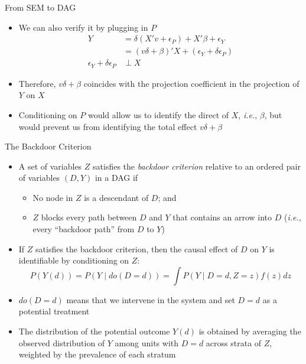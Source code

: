 \documentclass[aspectratio=1610,12pt,xcolor=dvipsnames]{beamer}
\begin{document}
\begin{frame}{From SEM to DAG}

\begin{itemize}
    \item We can also verify it by plugging in $P$
    \begin{align*}
        Y &= \delta (X'v + \epsilon_P) + X'\beta + \epsilon_Y \\
        &= (v\delta + \beta)'X + (\epsilon_Y + \delta \epsilon_P) \\
        \epsilon_Y + \delta \epsilon_P &\perp X
    \end{align*}
    \item Therefore, $v\delta + \beta$ coincides with the projection coefficient in the projection of $Y$ on $X$ \pause
    \item Conditioning on $P$ would allow us to identify the direct of $X$, \textit{i.e.}, $\beta$, but would prevent us from identifying the total effect $v\delta + \beta$
\end{itemize}

\end{frame}

\begin{frame}{The Backdoor Criterion}

\begin{itemize}
    \item A set of variables $Z$ satisfies the \textit{backdoor criterion} relative to an ordered pair of variables $(D,Y)$ in a DAG if
    \begin{itemize}
        \item No node in $Z$ is a descendant of $D$; and
        \item $Z$ blocks every path between $D$ and $Y$ that contains an arrow into $D$ (\textit{i.e.}, every ``backdoor path'' from $D$ to $Y$) \pause
    \end{itemize}
    \item If $Z$ satisfies the backdoor criterion, then the causal effect of $D$ on $Y$ is identifiable by conditioning on $Z$:
    \[
    P(Y(d)) = P(Y \mid do(D=d)) = \int P(Y \mid D=d, Z=z) f(z) dz
    \]
    \item $do(D=d)$ means that we intervene in the system and set $D=d$ as a potential treatment
    \item The distribution of the potential outcome $Y(d)$ is obtained by averaging the observed distribution of $Y$ among units with $D=d$ across strata of $Z$, weighted by the prevalence of each stratum
\end{itemize}
\end{frame}
\end{document}
